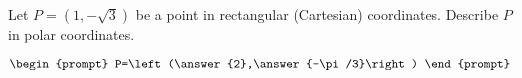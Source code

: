 \documentclass{ximera}
\author{Gregory Hartman \and Matthew Carr}
\begin{document}
\begin{exercise}





Let $P=(1,-\sqrt{3})$ be a point in rectangular (Cartesian) coordinates. Describe $P$ in polar coordinates.

\[
\begin{prompt}
P=\left(\answer{2},\answer{-\pi/3}\right)
\end{prompt}
\]

\end{exercise}
\end{document}
